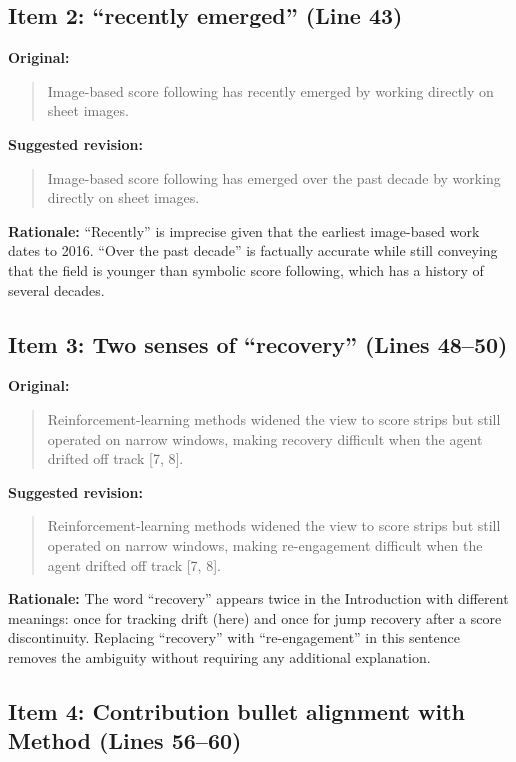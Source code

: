 \documentclass{article}
\begin{document}
\subsection*{Item 2: ``recently emerged'' (Line 43)}

\textbf{Original:}
\begin{quote}
Image-based score following has recently emerged by working directly on sheet images.
\end{quote}

\textbf{Suggested revision:}
\begin{quote}
Image-based score following has emerged over the past decade by working directly on sheet images.
\end{quote}

\textbf{Rationale:}
``Recently'' is imprecise given that the earliest image-based work dates to 2016. ``Over the past decade'' is factually accurate while still conveying that the field is younger than symbolic score following, which has a history of several decades.

\subsection*{Item 3: Two senses of ``recovery'' (Lines 48--50)}

\textbf{Original:}
\begin{quote}
Reinforcement-learning methods widened the view to score strips but still operated on narrow windows, making recovery difficult when the agent drifted off track [7, 8].
\end{quote}

\textbf{Suggested revision:}
\begin{quote}
Reinforcement-learning methods widened the view to score strips but still operated on narrow windows, making re-engagement difficult when the agent drifted off track [7, 8].
\end{quote}

\textbf{Rationale:}
The word ``recovery'' appears twice in the Introduction with different meanings: once for tracking drift (here) and once for jump recovery after a score discontinuity. Replacing ``recovery'' with ``re-engagement'' in this sentence removes the ambiguity without requiring any additional explanation.

\subsection*{Item 4: Contribution bullet alignment with Method (Lines 56--60)}
\end{document}
